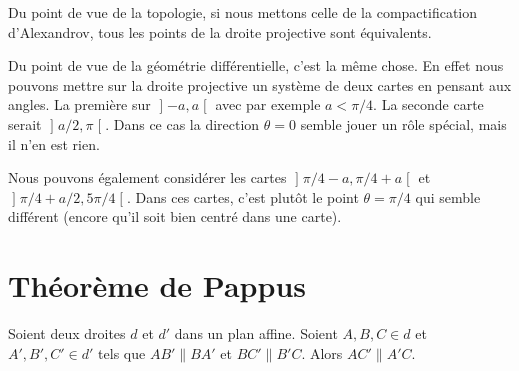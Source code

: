 \newcommand{\CaptionFigChoixInfini}{Deux façons de voir la droite projective. Étant donné que les points de la droite projective doivent être interprétés comme des directions (des classes d'équivallence), en réalité les deux dessins représentent les mêmes ensembles.}


\begin{remark}
    Du point de vue de la topologie, si nous mettons celle de la compactification d'Alexandrov, tous les points de la droite projective sont équivalents.

    Du point de vue de la géométrie différentielle, c'est la même chose. En effet nous pouvons mettre sur la droite projective un système de deux cartes en pensant aux angles. La première sur \( \mathopen] -a , a \mathclose[\) avec par exemple \( a<\pi/4\). La seconde carte serait \( \mathopen] a/2 , \pi \mathclose[\). Dans ce cas la direction \( \theta=0\) semble jouer un rôle spécial, mais il n'en est rien.

    Nous pouvons également considérer les cartes \( \mathopen] \pi/4-a , \pi/4+a \mathclose[\) et \( \mathopen] \pi/4+a/2 , 5\pi/4 \mathclose[\). Dans ces cartes, c'est plutôt le point \( \theta=\pi/4\) qui semble différent (encore qu'il soit bien centré dans une carte).
\end{remark}


\section{Théorème de Pappus}

\begin{theorem}     
    Soient deux droites \( d\) et \( d'\) dans un plan affine. Soient \( A,B,C\in d\) et \( A',B',C'\in d'\) tels que \( AB'\parallel BA'\) et \( BC'\parallel B'C\). Alors \( AC'\parallel A'C\).
\end{theorem}

